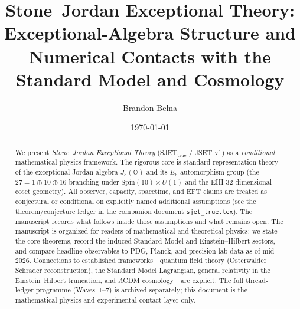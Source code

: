 \documentclass[aps,prd,onecolumn,amsmath,amssymb,nofootinbib,11pt]{revtex4-2}
\numberwithin{equation}{section}
\theoremstyle{plain}
\theoremstyle{definition}
\theoremstyle{remark}
\newcommand{\Spin}{\mathrm{Spin}}
\begin{document}
\title{Stone--Jordan Exceptional Theory: Exceptional-Algebra Structure and Numerical Contacts with the Standard Model and Cosmology}
\author{Brandon Belna}
\date{\today}

\begin{abstract}
We present \emph{Stone--Jordan Exceptional Theory} (SJET$_{\mathrm{true}}$ / JSET v1) as a \emph{conditional} mathematical-physics framework. The rigorous core is standard representation theory of the exceptional Jordan algebra $J_3(\mathbb{O})$ and its $E_6$ automorphism group (the $27=1\oplus10\oplus16$ branching under $\Spin(10)\times U(1)$ and the EIII 32-dimensional coset geometry). All observer, capacity, spacetime, and EFT claims are treated as conjectural or conditional on explicitly named additional assumptions (see the theorem/conjecture ledger in the companion document \texttt{sjet_true.tex}). The manuscript records what follows inside those assumptions and what remains open. The manuscript is organized for readers of mathematical and
theoretical physics: we state the core theorems, record the induced
Standard-Model and Einstein--Hilbert sectors, and compare headline observables
to PDG, Planck, and precision-lab data as of mid-2026. Connections to
established frameworks---quantum field theory (Osterwalder--Schrader
reconstruction), the Standard Model Lagrangian, general relativity in the
Einstein--Hilbert truncation, and $\Lambda$CDM cosmology---are explicit. The
full thread-ledger programme (Waves~1--7) is archived separately; this document
is the mathematical-physics and experimental-contact layer only.
\end{abstract}
\maketitle
\tableofcontents
\end{document}
